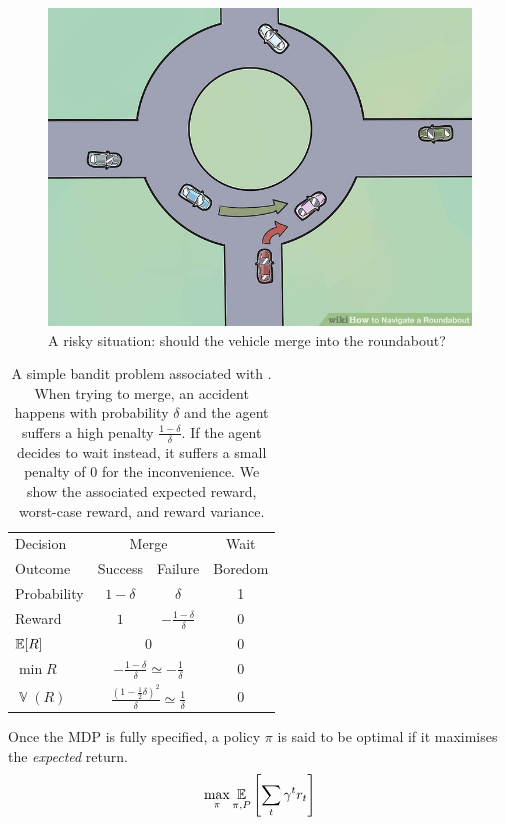 \begin{figure}[ht]
	\centering
	\includegraphics[width=0.5\linewidth]{img/roundabout}
	\caption{A risky situation: should the vehicle merge into the roundabout?}
	\label{fig:risky-problem}
\end{figure}
\begin{table}[ht]
	\centering
	\begin{tabular}{lccc}
		\toprule
		Decision & \multicolumn{2}{c}{Merge} & Wait \\
		\cmidrule(lr){2-3}
		\cmidrule(lr){4-4}
		Outcome & Success & Failure & Boredom \\
		Probability & $1-\delta$ & $\delta$ & 1 \\
		Reward & $1$ & $-\frac{1-\delta}{\delta}$ & 0 \\
		\midrule
		$\operatorname*{\mathbb{E}}[R]$ & \multicolumn{2}{c}{$0$} & $0$ \\
		$\min R$ & \multicolumn{2}{c}{$-\frac{1-\delta}{\delta} \simeq -\frac{1}{\delta}$} & $0$ \\
		$\mathop{\mathbb{V}}(R)$ & \multicolumn{2}{c}{$\frac{(1-\frac{1}{2}\delta)^2}{\delta} \simeq \frac{1}{\delta}$} & $0$ \\
		\bottomrule	
	\end{tabular}
	\caption{A simple bandit problem associated with . When trying to merge, an accident happens with probability $\delta$ and the agent suffers a high penalty $\frac{1-\delta}{\delta}$. If the agent decides to wait instead, it suffers a small penalty of $0$ for the inconvenience. We show the associated expected reward, worst-case reward, and reward variance.}
\end{table}

Once the \acl*{MDP} is fully specified, a policy $\pi$ is said to be optimal if it maximises the \emph{expected} return.
\begin{equation*}
\max_\pi \operatorname*{\mathbb{E}}_{\pi, P} \left[\sum_t \gamma^t r_t \right]
\end{equation*}

